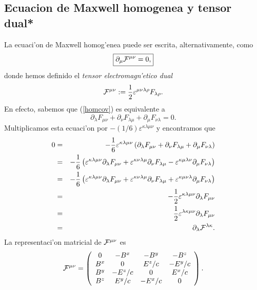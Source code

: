 \subsection{Ecuacion de Maxwell homogenea y tensor dual*}
La ecuaci'on de Maxwell homog'enea puede ser escrita, alternativamente, como
\begin{equation}
\boxed{\partial_\mu {\cal F}^{\mu\nu}=0,}
\end{equation}
donde hemos definido el \textit{tensor electromagn'etico dual}
\begin{equation}
{\cal F}^{\mu\nu}:=\frac{1}{2}\varepsilon^{\mu\nu\lambda\rho}F_{\lambda\rho} .
\end{equation}
En efecto, sabemos que (\ref{homcov}) es equivalente a
\begin{equation}
\partial_{\lambda}F_{\mu\nu}+\partial_{\nu}F_{\lambda\mu}+\partial_\mu %
F_{\nu\lambda}  =0.
\end{equation}
Multiplicamos esta ecuaci'on por $-(1/6)\varepsilon^{\kappa\lambda\mu\nu}$
y encontramos que
\begin{eqnarray}
0&=&-\frac{1}{6}\varepsilon^{\kappa\lambda\mu\nu}\left(  \partial_{\lambda}%
F_{\mu\nu}+\partial_{\nu}F_{\lambda\mu}+\partial_\mu F_{\nu\lambda}\right)\\
&=&-\frac{1}{6}\left(  \varepsilon^{\kappa\lambda\mu\nu}\partial_{\lambda}%
F_{\mu\nu}+\varepsilon^{\kappa\nu\lambda\mu}\partial_{\nu}F_{\lambda\mu
}-\varepsilon^{\kappa\mu\lambda\nu}\partial_\mu F_{\nu\lambda}\right) \\
&=&-\frac{1}{6}\left(  \varepsilon^{\kappa\lambda\mu\nu}\partial_{\lambda}%
F_{\mu\nu}+\varepsilon^{\kappa\nu\lambda\mu}\partial_{\nu}F_{\lambda\mu
}+\varepsilon^{\kappa\mu\nu\lambda}\partial_\mu F_{\nu\lambda}\right) \\
&=&-\frac{1}{2}\varepsilon^{\kappa\lambda\mu\nu}\partial_{\lambda}F_{\mu\nu} \\
&=&\frac{1}{2}\varepsilon^{\lambda\kappa\mu\nu}\partial_{\lambda}F_{\mu\nu} \\
&=&\partial_{\lambda}{\cal F}^{\lambda\kappa}  .
\end{eqnarray}
La representaci'on matricial de ${\cal F}^{\mu\nu}$ es
\begin{equation}
{\cal F}^{\mu\nu}=\left(
\begin{array}
[c]{cccc}%
0 & -B^x & -B^y & -B^z\\
B^x & 0 & E^z/c & -E^y/c\\
B^y & -E^z/c & 0 & E^x/c\\
B^z & E^y/c & -E^x/c & 0
\end{array}
\right). \label{Fdualupup}
\end{equation}

